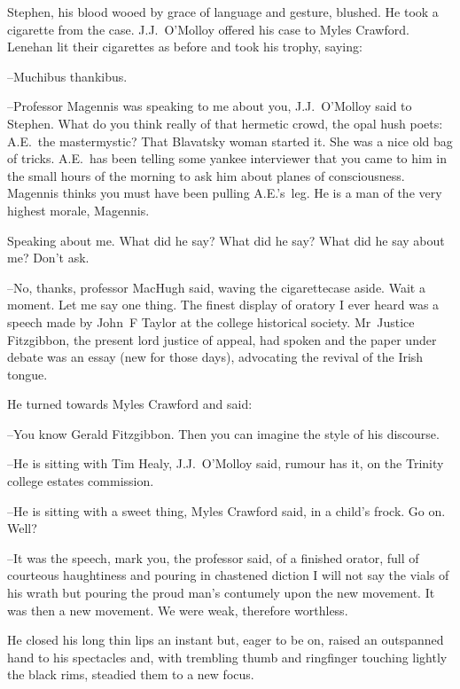 Stephen,
his blood wooed by grace of language and gesture,
blushed.
He took a cigarette from the case.
J.J.~O'Molloy offered his case to Myles Crawford.
Lenehan lit their cigarettes as before
and took his trophy,
saying:

--Muchibus thankibus.



--Professor Magennis was speaking to me about you,
J.J.~O'Molloy said to Stephen.
What do you think really of that hermetic crowd,
the opal hush poets:
A.E.~the mastermystic?
That Blavatsky woman started it.
She was a nice old bag of tricks.
A.E.~has been telling some yankee interviewer
that you came to him in the small hours of the morning
to ask him about planes of consciousness.
Magennis thinks you must have been pulling A.E.'s~leg.
He is a man of the very highest morale,
Magennis.

Speaking about me.
What did he say?
What did he say?
What did he say about me?
Don't ask.

--No, thanks,
professor MacHugh said,
waving the cigarettecase aside.
Wait a moment.
Let me say one thing.
The finest display of oratory I ever heard
was a speech made by John~F Taylor at the college historical society.
Mr~Justice Fitzgibbon,
the present lord justice of appeal,
had spoken
and the paper under debate was an essay (new for those days),
advocating the revival of the Irish tongue.

He turned towards Myles Crawford and said:

--You know Gerald Fitzgibbon.
Then you can imagine the style of his discourse.

--He is sitting with Tim Healy,
J.J.~O'Molloy said,
rumour has it,
on the Trinity college estates commission.

--He is sitting with a sweet thing,
Myles Crawford said,
in a child's frock.
Go on.
Well?

--It was the speech,
mark you,
the professor said,
of a finished orator,
full of courteous haughtiness and pouring in chastened diction
I will not say the vials of his wrath
but pouring the proud man's contumely upon the new movement.
It was then a new movement.
We were weak,
therefore worthless.

He closed his long thin lips an instant
but, eager to be on,
raised an outspanned hand to his spectacles
and, with trembling thumb and ringfinger touching lightly the black rims,
steadied them to a new focus.



